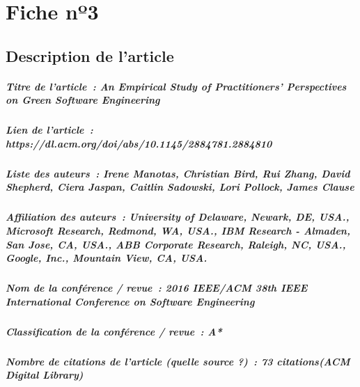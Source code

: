 
\chapter{Fiche nº3} %
\label{app:Fiche3} %

\section{Description de l'article}

\paragraph{Titre de l'article~: \textnormal{An Empirical Study of Practitioners' Perspectives on Green Software Engineering}}
\paragraph{Lien de l'article~: \textnormal{https://dl.acm.org/doi/abs/10.1145/2884781.2884810}}
\paragraph{Liste des auteurs~: \textnormal{Irene Manotas, Christian Bird, Rui Zhang, David Shepherd, Ciera Jaspan, Caitlin Sadowski, Lori Pollock, James Clause}}
\paragraph{Affiliation des auteurs~: \textnormal{University of Delaware, Newark, DE, USA., Microsoft Research, Redmond, WA, USA., IBM Research - Almaden, San Jose, CA, USA., ABB Corporate Research, Raleigh, NC, USA., Google, Inc., Mountain View, CA, USA.}}
\paragraph{Nom de la conférence / revue~: \textnormal{2016 IEEE/ACM 38th IEEE International Conference on Software Engineering}}
\paragraph{Classification de la conférence / revue~: \textnormal{A*}}
\paragraph{Nombre de citations de l'article (quelle source ?)~: \textnormal{73 citations(ACM Digital Library)}}



